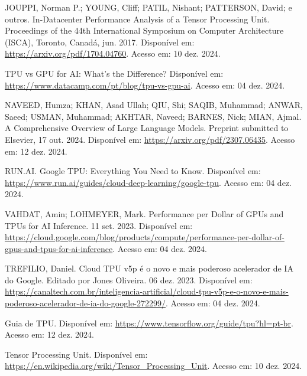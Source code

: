 \documentclass{report}
\begin{document}
JOUPPI, Norman P.; YOUNG, Cliff; PATIL, Nishant; PATTERSON, David; e outros. In-Datacenter Performance Analysis of a Tensor Processing Unit. Proceedings of the 44th International Symposium on Computer Architecture (ISCA), Toronto, Canadá, jun. 2017. Disponível em: \href{https://arxiv.org/pdf/1704.04760}{https://arxiv.org/pdf/1704.04760}. Acesso em: 10 dez. 2024.

TPU vs GPU for AI: What's the Difference? Disponível em: \href{https://www.datacamp.com/pt/blog/tpu-vs-gpu-ai}{https://www.datacamp.com/pt/blog/tpu-vs-gpu-ai}. Acesso em: 04 dez. 2024.

NAVEED, Humza; KHAN, Asad Ullah; QIU, Shi; SAQIB, Muhammad; ANWAR, Saeed; USMAN, Muhammad; AKHTAR, Naveed; BARNES, Nick; MIAN, Ajmal. A Comprehensive Overview of Large Language Models. Preprint submitted to Elsevier, 17 out. 2024. Disponível em: \href{https://arxiv.org/pdf/2307.06435}{https://arxiv.org/pdf/2307.06435}. Acesso em: 12 dez. 2024.

RUN.AI. Google TPU: Everything You Need to Know. Disponível em: \href{https://www.run.ai/guides/cloud-deep-learning/google-tpu}{https://www.run.ai/guides/cloud-deep-learning/google-tpu}. Acesso em: 04 dez. 2024.

VAHDAT, Amin; LOHMEYER, Mark. Performance per Dollar of GPUs and TPUs for AI Inference. 11 set. 2023. Disponível em: \href{https://cloud.google.com/blog/products/compute/performance-per-dollar-of-gpus-and-tpus-for-ai-inference}{https://cloud.google.com/blog/products/compute/performance-per-dollar-of-gpus-and-tpus-for-ai-inference}. Acesso em: 04 dez. 2024.

TREFILIO, Daniel. Cloud TPU v5p é o novo e mais poderoso acelerador de IA do Google. Editado por Jones Oliveira. 06 dez. 2023. Disponível em: \href{https://canaltech.com.br/inteligencia-artificial/cloud-tpu-v5p-e-o-novo-e-mais-poderoso-acelerador-de-ia-do-google-272299/}{https://canaltech.com.br/inteligencia-artificial/cloud-tpu-v5p-e-o-novo-e-mais-poderoso-acelerador-de-ia-do-google-272299/}. Acesso em: 04 dez. 2024.

Guia de TPU. Disponível em: \href{https://www.tensorflow.org/guide/tpu?hl=pt-br}{https://www.tensorflow.org/guide/tpu?hl=pt-br}. Acesso em: 12 dez. 2024.

Tensor Processing Unit. Disponível em: \href{https://en.wikipedia.org/wiki/Tensor_Processing_Unit}{https://en.wikipedia.org/wiki/Tensor\_Processing\_Unit}. Acesso em: 10 dez. 2024.
\end{document}
